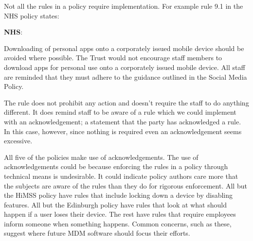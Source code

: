 \documentclass{llncs}
\newenvironment{policyrule}[1]{%
  \begin{mdframed}\footnotesize
      \noindent\textbf{\sffamily #1}:~\itshape%
}{%
  \end{mdframed}
}
\begin{document}
Not all the rules in a policy require implementation.
For example rule 9.1 in the NHS policy states:
\begin{policyrule}{NHS}
  Downloading of personal apps onto a corporately issued mobile device should be avoided where possible.
  The Trust would not encourage staff members to download apps for personal use onto a corporately issued mobile device.
  All staff are reminded that they must adhere to the guidance outlined in the Social Media Policy.
\end{policyrule}
The rule does not prohibit any action and doesn't require the staff to do anything different.
It does remind staff to be aware of a rule which we could implement with an acknowledgement; a statement that the party has acknowledged a rule.
In this case, however, since nothing is required even an acknowledgement seems excessive.

All five of the policies make use of acknowledgements.
The use of acknowledgements could be because enforcing the rules in a policy through technical means is undesirable. 
It could indicate policy authors care more that the subjects are aware of the rules than they do for rigorous enforcement.
All but the \ac{HiMSS} policy have rules that include locking down a device by disabling features.
All but the Edinburgh policy have rules that look at what should happen if a user loses their device.
The rest have rules that require employees inform someone when something happens.
Common concerns, such as these, suggest where future \ac{MDM} software should focus their efforts.
\end{document}
